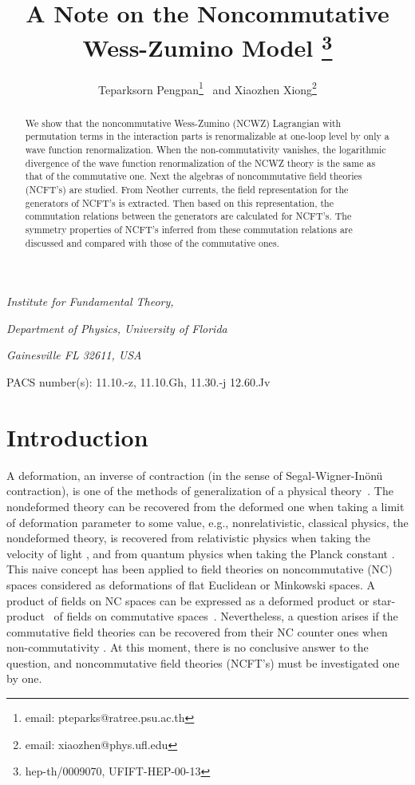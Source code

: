 \documentclass[a4paper,a4paper]{article}
\begin{document}
\title{A Note on the Noncommutative Wess-Zumino Model
\footnote{hep-th/0009070, UFIFT-HEP-00-13}}
\author{Teparksorn Pengpan\footnote{email: pteparks@ratree.psu.ac.th}~  
and Xiaozhen Xiong\footnote{email: xiaozhen@phys.ufl.edu}}
\date{}
\maketitle
\centerline{\it Institute for Fundamental Theory,}
\centerline{\it Department of Physics, University of Florida}
\centerline{\it Gainesville FL 32611, USA}
\vskip 1cm
\begin{abstract}
We show that the noncommutative Wess-Zumino (NCWZ) Lagrangian with permutation terms 
in the interaction parts is renormalizable at one-loop level by only a wave function 
renormalization. When the non-commutativity vanishes, the logarithmic divergence 
of the wave function renormalization of the NCWZ theory 
is the same as that of the commutative one. Next the algebras of noncommutative 
field theories (NCFT's) are studied. From Neother currents, the field representation 
for the generators of NCFT's is extracted. Then based on this representation, 
the commutation relations between the generators are calculated for NCFT's. 
The symmetry properties of NCFT's inferred from these commutation relations are
discussed and compared with those of the commutative ones. 
\end{abstract}
\vskip 1cm
\noindent PACS number(s): 11.10.-z, 11.10.Gh, 11.30.-j 12.60.Jv
\vskip 1cm
\section{Introduction}


A deformation, an inverse of contraction (in the sense of Segal-Wigner-In\"{o}n\"{u} 
contraction), is one of the methods of generalization of a physical theory~\cite{Bayen}. 
The nondeformed theory can be recovered from the deformed one when taking 
a limit of deformation parameter to some value, e.g., nonrelativistic, 
classical physics, the nondeformed theory, is recovered from relativistic physics 
when taking the velocity of light \coordHE{}, and from quantum physics 
when taking the Planck constant \coordHE{}. This naive concept has been applied 
to field theories on noncommutative (NC) spaces considered as deformations of flat Euclidean 
or Minkowski spaces. A product of fields on NC spaces can be 
expressed as a deformed product or star-product~\cite{Moyal,Zac}
 of fields on commutative spaces~\cite{Filk,SW,MRS}. 
Nevertheless, a question arises if the commutative field theories can be recovered
from their NC counter ones when non-commutativity \coordHE{}. 
At this moment, there is no conclusive answer to the question, and noncommutative 
field theories (NCFT's) 
must be investigated one by one.
\end{document}
